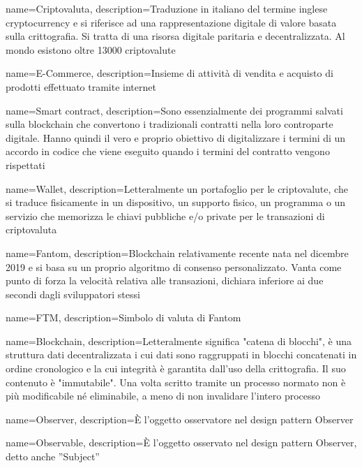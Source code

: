 {
  name={Criptovaluta},
  description={Traduzione in italiano del termine inglese cryptocurrency e si riferisce ad una rappresentazione digitale di valore basata sulla crittografia. Si tratta di una risorsa digitale paritaria e decentralizzata. Al mondo esistono oltre 13000 criptovalute}
}

{
  name={E-Commerce},
  description={Insieme di attività di vendita e acquisto di prodotti effettuato tramite internet}
}

{
  name={Smart contract},
  description={Sono essenzialmente dei programmi salvati sulla blockchain che convertono i tradizionali contratti nella loro controparte digitale. Hanno quindi il vero e proprio obiettivo di digitalizzare i termini di un accordo in codice che viene eseguito quando i termini del contratto vengono rispettati}
}

{
  name={Wallet},
  description={Letteralmente un portafoglio per le criptovalute, che si traduce fisicamente in un dispositivo, un supporto fisico, un programma o un servizio che memorizza le chiavi pubbliche e/o private per le transazioni di criptovaluta}
}

{
  name={Fantom},
  description={Blockchain relativamente recente nata nel dicembre 2019 e si basa su un proprio algoritmo di consenso personalizzato. Vanta come punto di forza la velocità relativa alle transazioni, dichiara inferiore ai due secondi dagli sviluppatori stessi}
}

{
  name={FTM},
  description={Simbolo di valuta di Fantom}
}

{
  name={Blockchain},
  description={Letteralmente significa "catena di blocchi", è una struttura dati decentralizzata i cui dati sono raggruppati in blocchi concatenati in ordine cronologico e la cui integrità è garantita dall'uso della crittografia. Il suo contenuto è "immutabile". Una volta scritto tramite un processo normato non è più modificabile né eliminabile, a meno di non invalidare l'intero processo}
}

{
  name={Observer},
  description={È l'oggetto osservatore nel design pattern Observer\glo}
}

{
  name={Observable},
  description={È l'oggetto osservato nel design pattern Observer\glo{}, detto anche ”Subject”}
}

